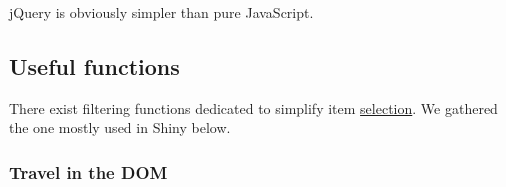 \documentclass[
]{book}
\begin{document}
jQuery is obviously simpler than pure JavaScript.

\hypertarget{useful-functions}{%
\subsection{Useful functions}\label{useful-functions}}

There exist filtering functions dedicated to simplify item \href{https://api.jquery.com/category/traversing/}{selection}. We gathered the one mostly used in Shiny below.

\hypertarget{travel-in-the-dom}{%
\subsubsection{Travel in the DOM}\label{travel-in-the-dom}}
\end{document}
